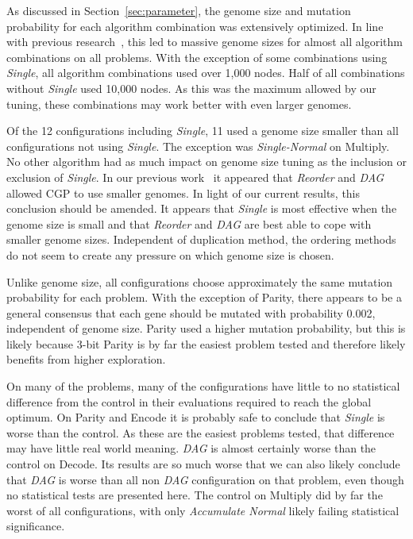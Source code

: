 \documentclass[journal]{IEEEtran}
\begin{document}
As discussed in Section~\ref{sec:parameter}, the genome size and mutation probability
for each algorithm combination was extensively optimized.  In line with previous
research~\cite{miller:2006:redundancy}, this led to massive genome sizes for
almost all algorithm combinations on all problems.  With the exception of 
some combinations using \emph{Single}, all algorithm combinations used over
1,000 nodes.  Half of all combinations without \emph{Single} used 10,000 nodes.
As this was the maximum allowed by our tuning, these combinations may work better with even larger
genomes.

Of the 12 configurations including \emph{Single}, 11 used a genome size smaller
than all configurations not using \emph{Single}.  The exception was \emph{Single-Normal}
on Multiply.  No other algorithm had as much impact on genome size tuning as
the inclusion or exclusion of \emph{Single}.  In our previous work~\cite{goldman:2013:ordering}
it appeared that \emph{Reorder} and \emph{DAG} allowed CGP to use smaller genomes.
In light of our current results, this conclusion should be amended.
It appears that \emph{Single} is most effective when the genome size is small and
that \emph{Reorder} and \emph{DAG} are best able to cope with smaller genome sizes.
Independent of duplication method, the ordering methods do not seem to create any
pressure on which genome size is chosen.

Unlike genome size, all configurations choose approximately the same mutation probability
for each problem.  With the exception of Parity, there appears
to be a general consensus that each gene should be mutated with probability 0.002,
independent of genome size.  Parity used a higher mutation probability, but this is likely
because 3-bit Parity is by far the easiest problem tested and therefore likely benefits
from higher exploration.

On many of the problems, many of the configurations have little to no statistical
difference from the control in their evaluations required to reach the global optimum.
On Parity and Encode it is probably safe to conclude that \emph{Single} is worse than
the control.  As these are the easiest problems tested, that difference may have
little real world meaning.  \emph{DAG} is almost certainly worse than the control on
Decode.  Its results are so much worse that we can also likely conclude that \emph{DAG}
is worse than all non \emph{DAG} configuration on that problem, even though no statistical
tests are presented here.  The control on Multiply did by far the worst of all configurations,
with only \emph{Accumulate Normal} likely failing statistical significance.
\end{document}

